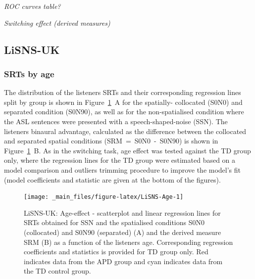\documentclass[a4paper, twoside]{templates/ociamthesis}
\begin{document}
\colorbox[HTML]{CCCCFF}{\emph{ROC curves table?}}

\colorbox[HTML]{CCCCFF}{\emph{Switching effect (derived measures)}}

\hypertarget{lisns-uk}{%
\subsection{LiSNS-UK}\label{lisns-uk}}

\hypertarget{srts-by-age}{%
\subsubsection*{SRTs by age}\label{srts-by-age}}

The distribution of the listeners SRTs and their corresponding regression lines split by group is shown in Figure~\ref{fig:LiSNS-Age}~A for the spatially- collocated (S0N0) and separated condition (S0N90), as well as for the non-spatialised condition where the ASL sentences were presented with a speech-shaped-noise (SSN). The listeners binaural advantage, calculated as the difference between the collocated and separated spatial conditions (SRM~=~S0N0~-~S0N90) is shown in Figure~\ref{fig:LiSNS-Age}~B. As in the switching task, age effect was tested against the TD group only, where the regression lines for the TD group were estimated based on a model comparison and outliers trimming procedure to improve the model's fit (model coefficients and statistic are given at the bottom of the figures).\\

\begin{figure}

{\centering \texttt{[image: \_main\_files/figure-latex/LiSNS-Age-1]} 

}

\caption{LiSNS-UK: Age-effect - scatterplot and linear regression lines for SRTs obtained for SSN and the spatialised conditions S0N0 (collocated) and S0N90 (separated) (A) and the derived measure SRM (B) as a function of the listeners age. Corresponding regression coefficients and statistics is provided for TD group only. Red indicates data from the APD group and cyan indicates data from the TD control group.}\label{fig:LiSNS-Age}
\end{figure}
\end{document}
